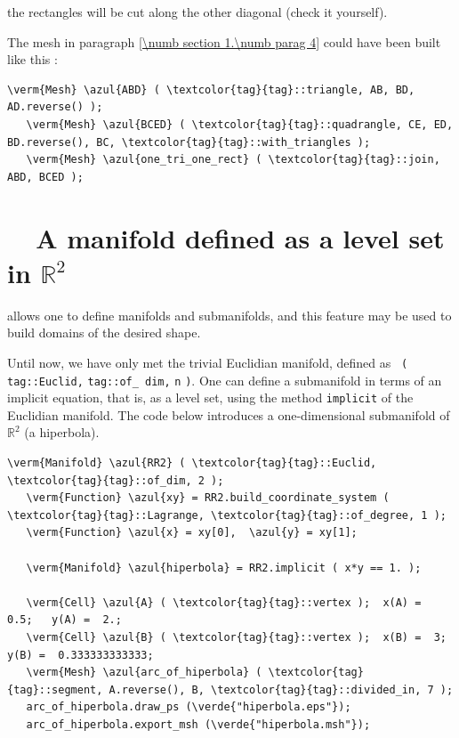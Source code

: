 \noindent the rectangles will be cut along the other diagonal (check it yourself).

The mesh in paragraph \ref{\numb section 1.\numb parag 4} could have been built like this :

\begin{Verbatim}[commandchars=\\\{\},formatcom=\small\tt,baselinestretch=0.94]
   \verm{Mesh} \azul{ABD} ( \textcolor{tag}{tag}::triangle, AB, BD, AD.reverse() );
   \verm{Mesh} \azul{BCED} ( \textcolor{tag}{tag}::quadrangle, CE, ED, BD.reverse(), BC, \textcolor{tag}{tag}::with_triangles );
   \verm{Mesh} \azul{one_tri_one_rect} ( \textcolor{tag}{tag}::join, ABD, BCED );
\end{Verbatim}


\section{~~A manifold defined as a level set in $ \mathbb{R}^2 $}
\label{\numb section 2.\numb parag 4}

{\ManiFEM} allows one to define manifolds and submanifolds, and this feature may be
used to build domains of the desired shape.

Until now, we have only met the trivial Euclidian manifold, defined as {\small\tt
{}\break ( \textcolor{tag}{tag}::Euclid,} {\small\tt \textcolor{tag}{tag}::of\_\,dim,} {\small\tt n}
{\small\tt )}.
One can define a submanifold in terms of an implicit equation, that is, as a level set,
using the method {\small\tt implicit} of the Euclidian manifold.
The code below introduces a one-dimensional submanifold of $ \mathbb{R}^2 $ (a hiperbola).

\begin{Verbatim}[commandchars=\\\{\},formatcom=\small\tt,frame=single,
   label=parag-\ref{\numb section 2.\numb parag 4}.cpp,rulecolor=\color{coment},
   baselinestretch=0.94,framesep=2mm]
   \verm{Manifold} \azul{RR2} ( \textcolor{tag}{tag}::Euclid, \textcolor{tag}{tag}::of_dim, 2 );
   \verm{Function} \azul{xy} = RR2.build_coordinate_system ( \textcolor{tag}{tag}::Lagrange, \textcolor{tag}{tag}::of_degree, 1 );
   \verm{Function} \azul{x} = xy[0],  \azul{y} = xy[1];
   
   \verm{Manifold} \azul{hiperbola} = RR2.implicit ( x*y == 1. );
   
   \verm{Cell} \azul{A} ( \textcolor{tag}{tag}::vertex );  x(A) =  0.5;   y(A) =  2.;
   \verm{Cell} \azul{B} ( \textcolor{tag}{tag}::vertex );  x(B) =  3;     y(B) =  0.333333333333;
   \verm{Mesh} \azul{arc_of_hiperbola} ( \textcolor{tag}{tag}::segment, A.reverse(), B, \textcolor{tag}{tag}::divided_in, 7 );
   arc_of_hiperbola.draw_ps (\verde{"hiperbola.eps"});
   arc_of_hiperbola.export_msh (\verde{"hiperbola.msh"});
\end{Verbatim}


